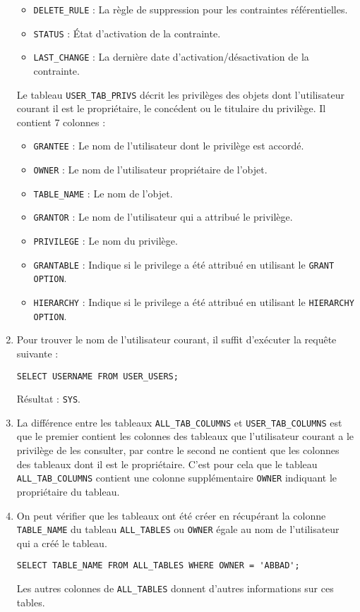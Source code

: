 \documentclass[12pt,a4paper]{article}
\begin{document}
\begin{enumerate}
\begin{itemize}
		\item \texttt{DELETE\_RULE} : La règle de suppression pour les contraintes référentielles.
		\item \texttt{STATUS} : \'{E}tat d'activation de la contrainte.
		\item \texttt{LAST\_CHANGE} : La dernière date d'activation/désactivation de la contrainte.
	\end{itemize}
	Le tableau \texttt{USER\_TAB\_PRIVS} décrit les privilèges des objets dont l'utilisateur courant il est le propriétaire,
	le concédent ou le titulaire du privilège. Il contient 7 colonnes :
	\begin{itemize}
		\item \texttt{GRANTEE} : Le nom de l'utilisateur dont le privilège est accordé.
		\item \texttt{OWNER} : Le nom de l'utilisateur propriétaire de l'objet.
		\item \texttt{TABLE\_NAME} : Le nom de l'objet.
		\item \texttt{GRANTOR} : Le nom de l'utilisateur qui a attribué le privilège.
		\item \texttt{PRIVILEGE} : Le nom du privilège.
		\item \texttt{GRANTABLE} : Indique si le privilege a été attribué en utilisant le \texttt{GRANT OPTION}.
		\item \texttt{HIERARCHY} : Indique si le privilege a été attribué en utilisant le \texttt{HIERARCHY OPTION}.
	\end{itemize}
	\item Pour trouver le nom de l'utilisateur courant, il suffit d'exécuter la requête suivante :
	\begin{lstlisting}[style=OracleSQL]
		SELECT USERNAME FROM USER_USERS;
	\end{lstlisting}
	Résultat : \texttt{SYS}.
	\item La différence entre les tableaux \texttt{ALL\_TAB\_COLUMNS} et \texttt{USER\_TAB\_COLUMNS} est que le premier contient
	les colonnes des tableaux que l'utilisateur courant a le privilège de les consulter, par contre le second ne contient que les
	colonnes des tableaux dont il est le propriétaire. C'est pour cela que le tableau \texttt{ALL\_TAB\_COLUMNS} contient une colonne
	supplémentaire \texttt{OWNER} indiquant le propriétaire du tableau.
	\item On peut vérifier que les tableaux ont été créer en récupérant la colonne \texttt{TABLE\_NAME} du tableau \texttt{ALL\_TABLES}
	ou \texttt{OWNER} égale au nom de l'utilisateur qui a créé le tableau.
	\begin{lstlisting}[style=OracleSQL]
		SELECT TABLE_NAME FROM ALL_TABLES WHERE OWNER = 'ABBAD';
	\end{lstlisting}
	Les autres colonnes de \texttt{ALL\_TABLES} donnent d'autres informations sur ces tables.
\end{enumerate}
\end{document}
